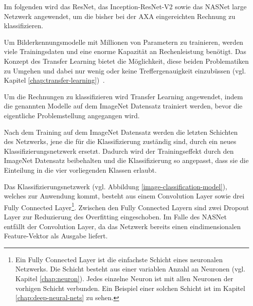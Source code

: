 




Im folgenden wird das ResNet, das Inception-ResNet-V2 sowie das NASNet large Netzwerk angewendet, um die bisher bei der AXA eingereichten Rechnung zu klassifizieren.

Um Bilderkennungsmodelle mit Millionen von Parametern zu trainieren, werden viele Trainingsdaten und eine enorme Kapazität an Rechenleistung benötigt. Das Konzept des Transfer Learning bietet die Möglichkeit, diese beiden Problematiken zu Umgehen und dabei nur wenig oder keine Treffergenauigkeit einzubüssen (vgl. Kapitel \ref{chap:transfer-learning})~\autocite{TDSTransferLearning}. %

Um die Rechnungen zu klassifizieren wird Transfer Learning angewendet, indem die genannten Modelle auf dem ImageNet Datensatz trainiert werden, bevor die eigentliche Problemstellung angegangen wird.

Nach dem Training auf dem ImageNet Datensatz werden die letzten Schichten des Netzwerks, jene die für die Klassifizierung zuständig sind, durch ein neues Klassifizierungsnetzwerk ersetzt. Dadurch wird der Trainingseffekt durch den ImageNet Datensatz beibehalten und die Klassifizierung so angepasst, dass sie die Einteilung in die vier vorliegenden Klassen erlaubt.

Das Klassifizierungsnetzwerk (vgl. Abbildung \ref{image-classification-model}), welches zur Anwendung kommt, besteht aus einem Convolution Layer sowie drei Fully Connected Layer\footnote{Ein Fully Connected Layer ist die einfachste Schicht eines neuronalen Netzwerks. Die Schicht besteht aus einer variablen Anzahl an Neuronen (vgl. Kapitel \ref{chap:neuron}). Jedes einzelne Neuron ist mit allen Neuronen der vorhigen Schicht verbunden. Ein Beispiel einer solchen Schicht ist im Kapitel \ref{chap:deep-neural-nets} zu sehen.}. Zwischen den Fully Connected Layern sind zwei Dropout Layer zur Reduzierung des Overfitting eingeschoben. Im Falle des NASNet entfällt der Convolution Layer, da das Netzwerk bereits einen eindimensionalen Feature-Vektor als Ausgabe liefert.


